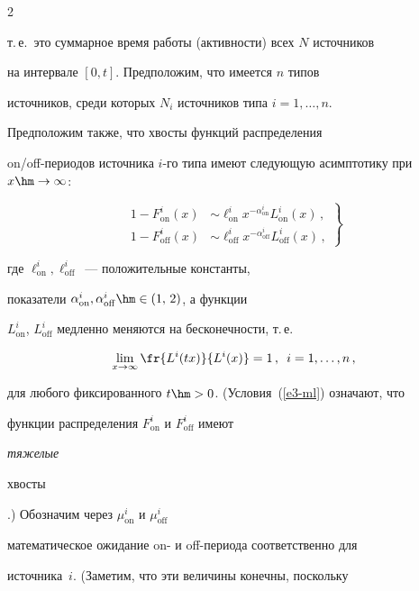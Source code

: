 \begin{multicols}{2}
\begin{equation*}
\end{equation*}


т.\,е.\ это суммарное время работы (активности)  всех $N$ источников


на интервале $[0,t]$. Предположим, что имеется  $n$ типов


источников, среди которых  $N_i$ источников типа $i=1,\ldots ,n$.


Предположим также, что хвосты функций распределения


on/off-пе\-рио\-дов  источника $i$-го типа имеют следующую асимптотику при $x \hm\to \infty$:


\begin{equation}


\left.


\begin{array}{rl}


1-F_{\mathrm{on}}^i(x)& \sim  \ell_{\mathrm{on}}^i x^{-\alpha_{\mathrm{on}}^i}L_{\mathrm{on}}^i(x)\,,\\[9pt]


1-F^i_{\mathrm{off}}(x)& \sim  \ell_{\mathrm{off}}^i x^{-\alpha_{\mathrm{off}}^i}L_{\mathrm{off}}^i(x)\,,


\end{array}


\right\}


\label{e3-ml}


\end{equation}


где $\ell_{\mathrm{on}}^i,\ell_{\mathrm{off}}^i$~--- положительные константы,


показатели  $\alpha_{\mathrm{on}}^i,\alpha_{\mathrm{off}}^i\hm\in (1,\,2)$, а функции


$L_{\mathrm{on}}^i$, $L_{\mathrm{off}}^i$  медленно меняются  на бесконечности, т.\,е.\


$$


\lim_{x \to \infty} \fr{L^i(tx)}{L^i(x)}=1\,,\enskip i=1,\ldots,n\,,


$$


для любого фиксированного $t \hm>0$.  (Условия~(\ref{e3-ml}) означают, что


функции распределения $F_{\mathrm{on}}^i$ и $F_{\mathrm{off}}^i$ имеют {\it тяжелые


хвосты}.) Обозначим через $\mu_{\mathrm{on}}^i$ и $\mu_{\mathrm{off}}^i$


математическое ожидание on- и off-пе\-рио\-да соответственно для


источника~$i$. (Заметим, что эти величины конечны, поскольку



\end{multicols}
